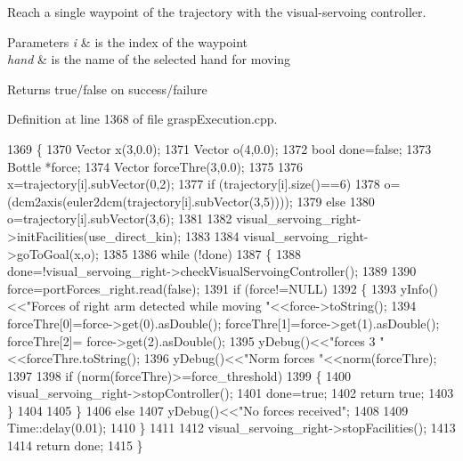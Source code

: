 Reach a single waypoint of the trajectory with the visual-\/servoing controller. 


\begin{DoxyParams}{Parameters}
{\em i} & is the index of the waypoint \\
\hline
{\em hand} & is the name of the selected hand for moving \\
\hline
\end{DoxyParams}
\begin{DoxyReturn}{Returns}
true/false on success/failure 
\end{DoxyReturn}


Definition at line 1368 of file grasp\+Execution.\+cpp.


\begin{DoxyCode}
1369 \{
1370     Vector x(3,0.0);
1371     Vector o(4,0.0);
1372     \textcolor{keywordtype}{bool} done=\textcolor{keyword}{false};
1373     Bottle *force;
1374     Vector forceThre(3,0.0);
1375 
1376     x=trajectory[i].subVector(0,2);
1377     \textcolor{keywordflow}{if} (trajectory[i].size()==6)
1378         o=(dcm2axis(euler2dcm(trajectory[i].subVector(3,5))));
1379     \textcolor{keywordflow}{else}
1380         o=trajectory[i].subVector(3,6);
1381 
1382     visual_servoing_right->initFacilities(use\_direct\_kin);
1383 
1384     visual_servoing_right->goToGoal(x,o);
1385     
1386     \textcolor{keywordflow}{while} (!done)
1387     \{
1388         done=!visual_servoing_right->checkVisualServoingController();
1389 
1390         force=portForces\_right.read(\textcolor{keyword}{false});
1391         \textcolor{keywordflow}{if} (force!=NULL)
1392         \{
1393             yInfo()<<\textcolor{stringliteral}{"Forces of right arm detected while moving     "}<<force->toString();
1394             forceThre[0]=force->get(0).asDouble();  forceThre[1]=force->get(1).asDouble();  forceThre[2]=
      force->get(2).asDouble();       
1395             yDebug()<<\textcolor{stringliteral}{"forces 3 "}<<forceThre.toString();  
1396             yDebug()<<\textcolor{stringliteral}{"Norm forces "}<<norm(forceThre);  
1397 
1398             \textcolor{keywordflow}{if} (norm(forceThre)>=force\_threshold)
1399             \{
1400                  visual_servoing_right->stopController();
1401                  done=\textcolor{keyword}{true};
1402                  \textcolor{keywordflow}{return} \textcolor{keyword}{true};
1403             \}
1404             
1405         \}
1406         \textcolor{keywordflow}{else}
1407             yDebug()<<\textcolor{stringliteral}{"No forces received"};
1408 
1409         Time::delay(0.01);
1410     \}
1411 
1412     visual_servoing_right->stopFacilities();
1413 
1414     \textcolor{keywordflow}{return} done;
1415 \}
\end{DoxyCode}
